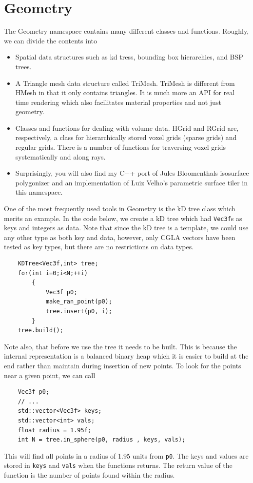 \documentclass[a4paper]{article}
\begin{document}
\section{Geometry}
The Geometry namespace contains many different classes and functions. Roughly, we can divide the contents into
\begin{itemize}
\item Spatial data structures such as kd tress, bounding box hierarchies, and BSP trees.
\item A Triangle mesh data structure called TriMesh. TriMesh is different from HMesh in that it only contains triangles. It is much more an API for real time rendering which also facilitates material properties and not just geometry.
\item Classes and functions for dealing with volume data. HGrid and RGrid are, respectively, a class for hierarchically stored voxel grids (sparse grids) and regular grids. There is a number of functions for traversing voxel grids systematically and along rays.
\item Surprisingly, you will also find my C++ port of Jules Bloomenthals isosurface polygonizer and an implementation of Luiz Velho's parametric surface tiler in this namespace.
\end{itemize}
One of the most frequently used tools in Geometry is the kD tree class which merits an example. In the code below, we create a kD tree which had \texttt{Vec3f}s as keys and integers as data. Note that since the kD tree is a template, we could use any other type as both key and data, however, only CGLA vectors have been tested as key types, but there are no restrictions on data types.
\begin{verbatim}
    KDTree<Vec3f,int> tree;
    for(int i=0;i<N;++i)
        {
            Vec3f p0;
            make_ran_point(p0);
            tree.insert(p0, i);
        }
    tree.build();
\end{verbatim}
Note also, that before we use the tree it needs to be built. This is because the internal representation is a balanced binary heap which it is easier to build at the end rather than maintain during insertion of new points. To look for the points near a given point, we can call
\begin{verbatim}
    Vec3f p0;
    // ...
    std::vector<Vec3f> keys;
    std::vector<int> vals;
    float radius = 1.95f;
    int N = tree.in_sphere(p0, radius , keys, vals);
\end{verbatim}
This will find all points in a radius of 1.95 units from \texttt{p0}. The keys and values are stored in \texttt{keys} and \texttt{vals} when the functions returns. The return value of the function is the number of points found within the radius. 
\end{document}
